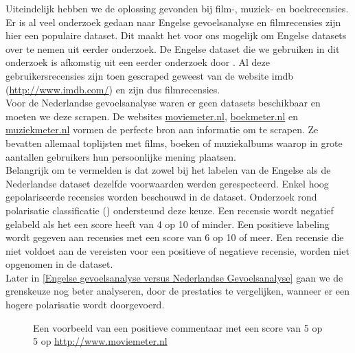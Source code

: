 Uiteindelijk hebben we de oplossing gevonden bij film-, muziek- en boekrecensies. Er is al veel onderzoek gedaan naar Engelse gevoelsanalyse en filmrecensies zijn hier een populaire dataset. Dit maakt het voor ons mogelijk om Engelse datasets over te nemen uit eerder onderzoek. De Engelse dataset die we gebruiken in dit onderzoek is afkomstig uit een eerder onderzoek door \cite{maas-EtAl:2011:ACL-HLT2011}. Al deze gebruikersrecensies zijn toen gescraped geweest van de website imdb (\url{http://www.imdb.com/}) en zijn dus filmrecensies.\\
Voor de Nederlandse gevoelsanalyse waren er geen datasets beschikbaar en moeten we deze scrapen. De websites \url{moviemeter.nl}, \url{boekmeter.nl} en \url{muziekmeter.nl} vormen de perfecte bron aan informatie om te scrapen. Ze bevatten allemaal toplijsten met films, boeken of muziekalbums waarop in grote aantallen gebruikers hun persoonlijke mening plaatsen.\\

Belangrijk om te vermelden is dat zowel bij het labelen van de Engelse als de Nederlandse dataset dezelfde voorwaarden werden gerespecteerd. Enkel hoog gepolariseerde recensies worden beschouwd in de dataset. Onderzoek rond polarisatie classificatie (\cite{maas-EtAl:2011:ACL-HLT2011}) ondersteund deze keuze. Een recensie wordt negatief gelabeld als het een score heeft van 4 op 10 of minder. Een positieve labeling wordt gegeven aan recensies met een score van 6 op 10 of meer. Een recensie die niet voldoet aan de vereisten voor een positieve of negatieve recensie, worden niet opgenomen in de dataset.\\

Later in \ref{Engelse gevoelsanalyse versus Nederlandse Gevoelsanalyse} gaan we de grenskeuze  nog beter analyseren, door de prestaties te vergelijken, wanneer er een hogere polarisatie wordt doorgevoerd.

\begin{figure}[h]%
    \centering
    \caption{Een voorbeeld van een positieve commentaar met een score van 5 op 5 op \url{http://www.moviemeter.nl}}%
\end{figure}

